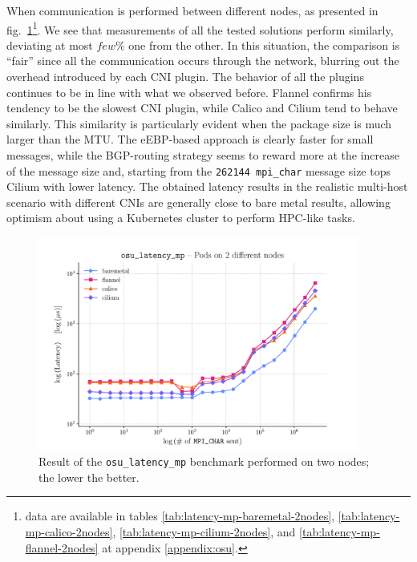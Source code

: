 When communication is performed between different nodes, as presented in
fig.~\ref{fig:latency-mp-2-nodes}\footnote{data are available in tables
\ref{tab:latency-mp-baremetal-2nodes}, \ref{tab:latency-mp-calico-2nodes},
\ref{tab:latency-mp-cilium-2nodes}, and \ref{tab:latency-mp-flannel-2nodes} at
appendix \ref{appendix:osu}.}. We see that measurements of all the tested
solutions perform similarly, deviating at most $few\%$ one from the other. In
this situation, the comparison is ``fair'' since all the communication occurs
through the network, blurring out the overhead introduced by each CNI plugin.
The behavior of all the plugins continues to be in line with what we observed
before. Flannel confirms his tendency to be the slowest CNI plugin, while Calico
and Cilium tend to behave similarly. This similarity is particularly evident
when the package size is much larger than the MTU. The eEBP-based approach is
clearly faster for small messages, while the BGP-routing strategy seems to
reward more at the increase of the message size and, starting from the
\texttt{262144 mpi\_char} message size tops Cilium with lower latency. The
obtained latency results in the realistic multi-host scenario with different
CNIs are generally close to bare metal results, allowing optimism about using a
Kubernetes cluster to perform HPC-like tasks.



\begin{figure}
  \centering
  \includegraphics[width=0.94\textwidth]{img/chpt3/latency_mp-2-nodes}
  \caption{Result of the \texttt{osu\_latency\_mp} benchmark performed on two
    nodes; the lower the better.}
  \label{fig:latency-mp-2-nodes}
\end{figure}



